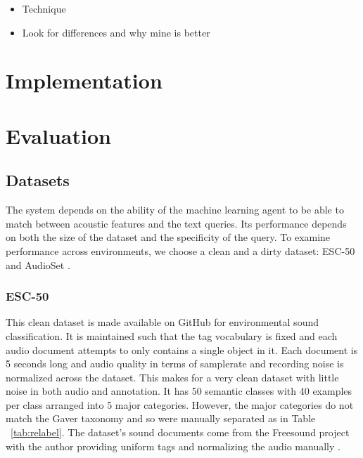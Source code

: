 \begin{itemize}
    \item Technique
    \item Look for differences and why mine is better
\end{itemize}

\section{Implementation}

\section{Evaluation}

\subsection{Datasets}
The system depends on the ability of the machine learning agent to be able to match between acoustic features and the text queries. Its performance depends on both the size of the dataset and the specificity of the query. To examine performance across environments, we choose a clean and a dirty dataset: ESC-50 \cite{Piczak2015} and AudioSet \cite{Gemmeke2017}.

\subsubsection{ESC-50}
This clean dataset is made available on GitHub for environmental sound classification. It is maintained such that the tag vocabulary is fixed and each audio document attempts to only contains a single object in it. Each document is 5 seconds long and audio quality in terms of samplerate and recording noise is normalized across the dataset. This makes for a very clean dataset with little noise in both audio and annotation. It has 50 semantic classes with 40 examples per class arranged into 5 major categories. However, the major categories do not match the Gaver taxonomy and so were manually separated as in Table ~\ref{tab:relabel}. The dataset's sound documents come from the Freesound project with the author providing uniform tags and normalizing the audio manually \cite{Font2013}.

